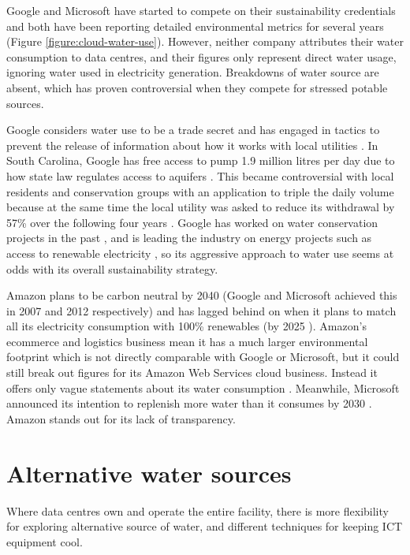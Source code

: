 \documentclass{article}
\begin{document}
Google and Microsoft have started to compete on their sustainability
credentials \cite{mytton_fighting_2020} and both have been reporting detailed
environmental metrics for several years (Figure \ref{figure:cloud-water-use}).
However, neither company attributes their water consumption to data centres,
and their figures only represent direct water usage, ignoring water used in
electricity generation. Breakdowns of water source are absent, which has proven
controversial when they compete for stressed potable sources.

Google considers water use to be a trade secret and has engaged in tactics to
prevent the release of information about how it works with local utilities
\cite{sattiraju_google_2020}. In South Carolina, Google has free access to pump
1.9 million litres per day due to how state law regulates access to aquifers
\cite{petersen_googles_2017}. This became controversial with local residents
and conservation groups with an application to triple the daily volume
\cite{mccammon_google_2017} because at the same time the local utility was
asked to reduce its withdrawal by 57\% over the following four years
\cite{sattiraju_google_2020}. Google has worked on water conservation projects
in the past \cite{brown_helping_2012}, and is leading the industry on energy
projects such as access to renewable electricity \cite{pichai_our_2020}, so its
aggressive approach to water use seems at odds with its overall sustainability
strategy.

Amazon plans to be carbon neutral by 2040 \cite{amazon_amazon_2019} (Google and
Microsoft achieved this in 2007 and 2012 respectively) and has lagged behind on
when it plans to match all its electricity consumption with 100\% renewables
(by 2025 \cite{amazon_amazon_2020}). Amazon's ecommerce and logistics business
mean it has a much larger environmental footprint which is not directly
comparable with Google or Microsoft, but it could still break out figures for
its Amazon Web Services cloud business. Instead it offers only vague statements
about its water consumption \cite{amazon_reducing_2019}. Meanwhile, Microsoft
announced its intention to replenish more water than it consumes by 2030
\cite{smith_microsoft_2020}. Amazon stands out for its lack of transparency.

\section*{Alternative water sources}

Where data centres own and operate the entire facility, there is more
flexibility for exploring alternative source of water, and different techniques
for keeping ICT equipment cool.
\end{document}
